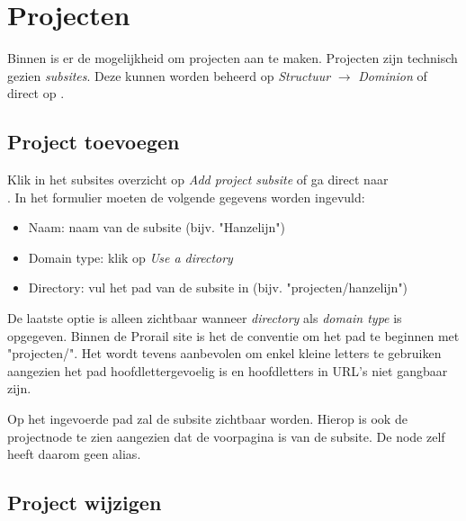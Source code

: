 \section{Projecten}

Binnen \customerdomain is er de mogelijkheid om projecten aan te maken. Projecten zijn technisch gezien \emph{subsites}. Deze kunnen worden beheerd op \emph{Structuur} $\rightarrow$ \emph{Dominion} of direct op .

\subsection{Project toevoegen}\label{projecttoevoegen}

Klik in het subsites overzicht op \emph{Add project subsite} of ga direct naar \\ . In het formulier moeten de volgende gegevens worden ingevuld:
\begin{itemize}
\item Naam: naam van de subsite (bijv. "Hanzelijn")
\item Domain type: klik op \emph{Use a directory}
\item Directory: vul het pad van de subsite in (bijv. "projecten/hanzelijn")
\end{itemize}
De laatste optie is alleen zichtbaar wanneer \emph{directory} als \emph{domain type} is opgegeven. Binnen de Prorail site is het de conventie om het pad te beginnen met "projecten/". Het wordt tevens aanbevolen om enkel kleine letters te gebruiken aangezien het pad hoofdlettergevoelig is en hoofdletters in URL's niet gangbaar zijn.

Op het ingevoerde pad zal de subsite zichtbaar worden. Hierop is ook de projectnode te zien aangezien dat de voorpagina is van de subsite. De node zelf heeft daarom geen alias.

\subsection{Project wijzigen}

